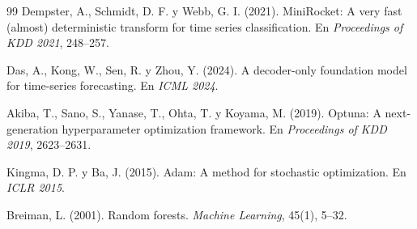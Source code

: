 \begin{thebibliography}{99}
 Dempster, A., Schmidt, D. F. y Webb, G. I. (2021). MiniRocket: A very fast (almost) deterministic
  transform for time series classification. En \textit{Proceedings of KDD 2021}, 248--257.

 Das, A., Kong, W., Sen, R. y Zhou, Y. (2024). A decoder-only foundation model for time-series
  forecasting. En \textit{ICML 2024}.

 Akiba, T., Sano, S., Yanase, T., Ohta, T. y Koyama, M. (2019). Optuna: A next-generation
  hyperparameter optimization framework. En \textit{Proceedings of KDD 2019}, 2623--2631.

 Kingma, D. P. y Ba, J. (2015). Adam: A method for stochastic optimization. En \textit{ICLR 2015}.

 Breiman, L. (2001). Random forests. \textit{Machine Learning}, 45(1), 5--32.

\end{thebibliography}
